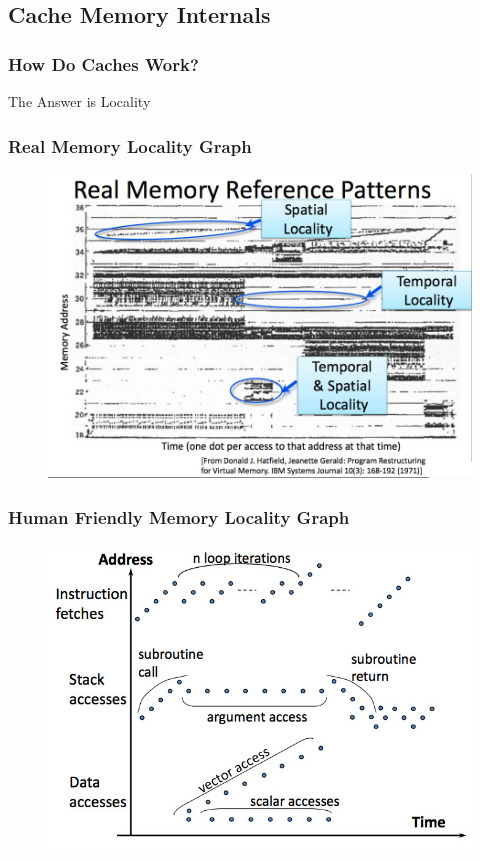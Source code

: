 \documentclass{beamer}
\begin{document}

\subsection{Cache Memory Internals}
\begin{frame}
	\frametitle{How Do Caches Work?}
	\Large{\centerline{The Answer is Locality}}

\end{frame}


\begin{frame}[plain]
	\frametitle{Real Memory Locality Graph}
		\begin{figure}
			\includegraphics[width=0.9\linewidth]{img/localitygraph.jpg}
		\end{figure}
\end{frame}


\begin{frame}[plain]
	\frametitle{Human Friendly Memory Locality Graph}
		\begin{figure}
			\includegraphics[width=0.9\linewidth]{img/localitygraph2.jpg}
		\end{figure}
\end{frame}
\end{document}
